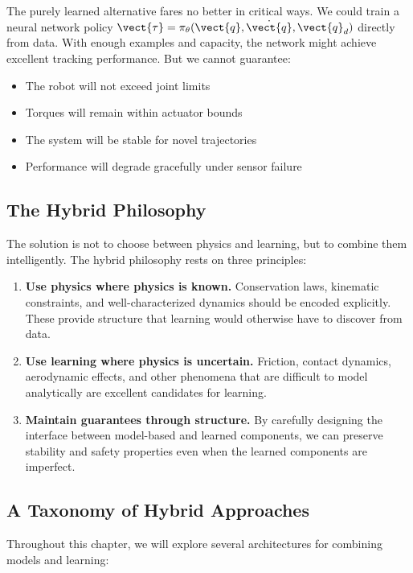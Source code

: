 The purely learned alternative fares no better in critical ways. We could train a neural network policy $\vect{\tau} = \pi_\theta(\vect{q}, \dot{\vect{q}}, \vect{q}_d)$ directly from data. With enough examples and capacity, the network might achieve excellent tracking performance. But we cannot guarantee:
\begin{itemize}
    \item The robot will not exceed joint limits
    \item Torques will remain within actuator bounds
    \item The system will be stable for novel trajectories
    \item Performance will degrade gracefully under sensor failure
\end{itemize}

\subsection{The Hybrid Philosophy}

The solution is not to choose between physics and learning, but to combine them intelligently. The hybrid philosophy rests on three principles:

\begin{enumerate}
    \item \textbf{Use physics where physics is known.} Conservation laws, kinematic constraints, and well-characterized dynamics should be encoded explicitly. These provide structure that learning would otherwise have to discover from data.

    \item \textbf{Use learning where physics is uncertain.} Friction, contact dynamics, aerodynamic effects, and other phenomena that are difficult to model analytically are excellent candidates for learning.

    \item \textbf{Maintain guarantees through structure.} By carefully designing the interface between model-based and learned components, we can preserve stability and safety properties even when the learned components are imperfect.
\end{enumerate}

\subsection{A Taxonomy of Hybrid Approaches}

Throughout this chapter, we will explore several architectures for combining models and learning:

